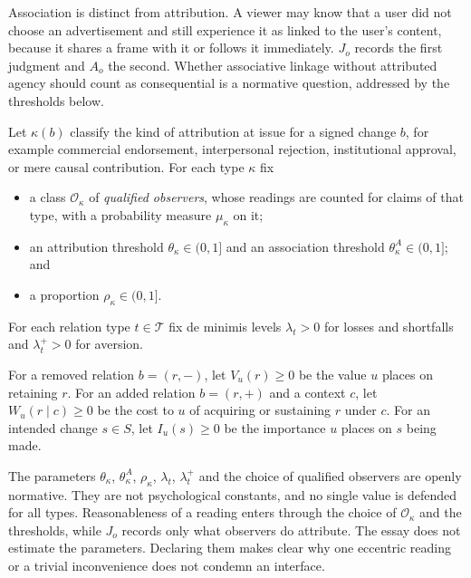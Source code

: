 \begin{remark}
Association is distinct from attribution. A viewer may know that a user did not choose an advertisement and still experience it as linked to the user's content, because it shares a frame with it or follows it immediately. $J_o$ records the first judgment and $A_o$ the second. Whether associative linkage without attributed agency should count as consequential is a normative question, addressed by the thresholds below.
\end{remark}

\begin{definition}
Let $\kappa(b)$ classify the kind of attribution at issue for a signed change $b$, for example commercial endorsement, interpersonal rejection, institutional approval, or mere causal contribution. For each type $\kappa$ fix
\begin{itemize}
  \item a class $\mathcal{O}_\kappa$ of \emph{qualified observers}, whose readings are counted for claims of that type, with a probability measure $\mu_\kappa$ on it;
  \item an attribution threshold $\theta_\kappa\in(0,1]$ and an association threshold $\theta^{A}_\kappa\in(0,1]$; and
  \item a proportion $\rho_\kappa\in(0,1]$.
\end{itemize}
For each relation type $t\in\mathcal{T}$ fix de minimis levels $\lambda_t>0$ for losses and shortfalls and $\lambda^{+}_t>0$ for aversion.
\end{definition}

\begin{definition}
For a removed relation $b=(r,-)$, let $V_u(r)\ge0$ be the value $u$ places on retaining $r$. For an added relation $b=(r,+)$ and a context $c$, let $W_u(r\mid c)\ge0$ be the cost to $u$ of acquiring or sustaining $r$ under $c$. For an intended change $s\in S$, let $I_u(s)\ge0$ be the importance $u$ places on $s$ being made.
\end{definition}

\begin{remark}
The parameters $\theta_\kappa$, $\theta^{A}_\kappa$, $\rho_\kappa$, $\lambda_t$, $\lambda^{+}_t$ and the choice of qualified observers are openly normative. They are not psychological constants, and no single value is defended for all types. Reasonableness of a reading enters through the choice of $\mathcal{O}_\kappa$ and the thresholds, while $J_o$ records only what observers do attribute. The essay does not estimate the parameters. Declaring them makes clear why one eccentric reading or a trivial inconvenience does not condemn an interface.
\end{remark}

